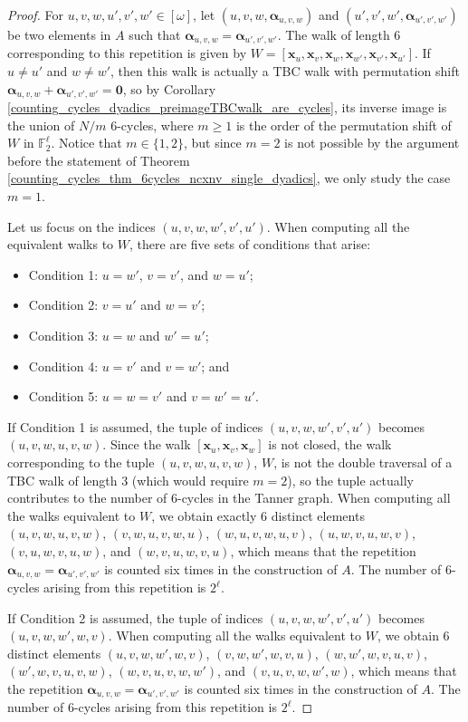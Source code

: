 \documentclass[11pt]{article}
\theoremstyle{plain}
\theoremstyle{plain}
\theoremstyle{definition}
\numberwithin{theo}{section}
\newcommand{\bzero}{\mathbf{0}}
\newcommand{\bx}{{\mathbf x}}
\newcommand{\balpha}{{\boldsymbol \alpha}}
\newcounter{alp}
\newcounter{rom}
\begin{document}
\begin{proof}
For $u,v,w,u',v',w'\in[\omega]$, let $(u,v,w,\balpha_{u,v,w})$ and $(u',v',w',\balpha_{u',v',w'})$ be two elements in $A$ such that $\balpha_{u,v,w}=\balpha_{u',v',w'}$. The walk of length 6 corresponding to this repetition is given by $W=[\bx_{u},\bx_{v},\bx_{w},\bx_{w'},\bx_{v'},\bx_{u'}]$. If $u\neq u'$ and $w\neq w'$, then this walk is actually a TBC walk with permutation shift $\balpha_{u,v,w}+\balpha_{u',v',w'}=\bzero$, so by Corollary \ref{counting_cycles_dyadics_preimageTBCwalk_are_cycles}, its inverse image is the union of $N/m$ 6-cycles, where $m\geq 1$ is the order of the permutation shift of $W$ in $\mathbb{F}_2^\ell$. Notice that $m\in\{1,2\}$, but since $m=2$ is not possible by the argument before the statement of Theorem \ref{counting_cycles_thm_6cycles_ncxnv_single_dyadics}, we only study the case $m=1$. 

Let us focus on the indices $(u,v,w,w',v',u')$. When computing all the equivalent walks to $W$, there are five sets of conditions that arise:
\begin{itemize}
\item Condition 1: $u=w'$, $v=v'$, and $w=u'$;
\item Condition 2: $v=u'$ and $w=v'$;
\item Condition 3: $u=w$ and $w'=u'$;
\item Condition 4: $u=v'$ and $v=w'$; and
\item Condition 5: $u=w=v'$ and $v=w'=u'$.
\end{itemize} 
If Condition 1 is assumed, the tuple of indices $(u,v,w,w',v',u')$ becomes $(u,v,w,u,v,w)$. Since the walk $[\bx_{u},\bx_{v},\bx_{w}]$ is not closed, the walk corresponding to the tuple $(u,v,w,u,v,w)$, $W$, is not the double traversal of a TBC walk of length 3 (which would require $m=2$), so the tuple actually contributes to the number of 6-cycles in the Tanner graph. When computing all the walks equivalent to $W$, we obtain exactly 6 distinct elements $(u,v,w,u,v,w)$, $(v,w,u,v,w,u)$, $(w,u,v,w,u,v)$, $(u,w,v,u,w,v)$, $(v,u,w,v,u,w)$, and $(w,v,u,w,v,u)$, which means that the repetition $\balpha_{u,v,w}=\balpha_{u',v',w'}$ is counted six times in the construction of $A$. The number of 6-cycles arising from this repetition is $2^\ell$.

If Condition 2 is assumed, the tuple of indices $(u,v,w,w',v',u')$ becomes $(u,v,w,w',w,v)$.  
When computing all the walks equivalent to $W$, we obtain 6 distinct elements $(u,v,w,w',w,v)$, $(v,w,w',w,v,u)$, $(w,w',w,v,u,v)$, $(w',w,v,u,v,w)$, $(w,v,u,v,w,w')$, and $(v,u,v,w,w',w)$, which means that the repetition $\balpha_{u,v,w}=\balpha_{u',v',w'}$ is counted six times in the construction of $A$. The number of 6-cycles arising from this repetition is $2^\ell$.


\end{proof}
\end{document}
